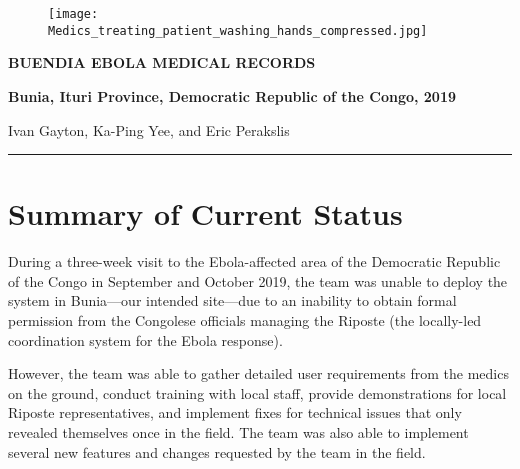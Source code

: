 \documentclass[a4paper,12pt,twoside]{article}
\begin{document}
\thispagestyle{empty}


\begin{figure}[t!]
\centering
\texttt{[image: Medics\_treating\_patient\_washing\_hands\_compressed.jpg]}
\end{figure}

\begin{center}
  \huge \color{RHblue} \textbf {BUENDIA EBOLA MEDICAL RECORDS}

\textbf{Bunia, Ituri Province, Democratic Republic of the Congo, 2019}
\end{center}
\medskip


\begin{center}
  Ivan Gayton, Ka-Ping Yee, and Eric Perakslis
  \
  
\end{center}
\medskip
\begin{center}
\color{RHblue}\rule{\textwidth}{0.5cm}
\end{center}

\newpage
\newpage


\tableofcontents

\newpage
\section{Summary of Current Status}
During a three-week visit to the Ebola-affected area of the Democratic Republic of the Congo in September and October 2019, the team was unable to deploy the system in Bunia---our intended site---due to an inability to obtain formal permission from the Congolese officials managing the Riposte (the locally-led coordination system for the Ebola response). 

However, the team was able to gather detailed user requirements from the medics on the ground, conduct training with local staff, provide demonstrations for local Riposte representatives, and implement fixes for technical issues that only revealed themselves once in the field. The team was also able to implement several new features and changes requested by the team in the field.
\end{document}
